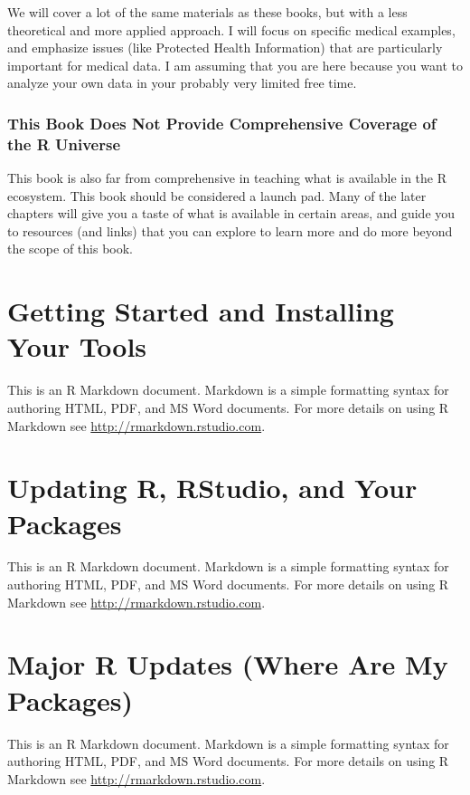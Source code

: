 \documentclass[]{book}
\begin{document}
We will cover a lot of the same materials as these books, but with a less theoretical and more applied approach. I will focus on specific medical examples, and emphasize issues (like Protected Health Information) that are particularly important for medical data. I am assuming that you are here because you want to analyze your own data in your probably very limited free time.

\hypertarget{this-book-does-not-provide-comprehensive-coverage-of-the-r-universe}{%
\subsection{This Book Does Not Provide Comprehensive Coverage of the R Universe}\label{this-book-does-not-provide-comprehensive-coverage-of-the-r-universe}}

This book is also far from comprehensive in teaching what is available in the R ecosystem. This book should be considered a launch pad. Many of the later chapters will give you a taste of what is available in certain areas, and guide you to resources (and links) that you can explore to learn more and do more beyond the scope of this book.

\hypertarget{getting-started-and-installing-your-tools}{%
\chapter{Getting Started and Installing Your Tools}\label{getting-started-and-installing-your-tools}}

This is an R Markdown document. Markdown is a simple formatting syntax for authoring HTML, PDF, and MS Word documents. For more details on using R Markdown see \url{http://rmarkdown.rstudio.com}.

\hypertarget{updating-r-rstudio-and-your-packages}{%
\chapter{Updating R, RStudio, and Your Packages}\label{updating-r-rstudio-and-your-packages}}

This is an R Markdown document. Markdown is a simple formatting syntax for authoring HTML, PDF, and MS Word documents. For more details on using R Markdown see \url{http://rmarkdown.rstudio.com}.

\hypertarget{major-r-updates-where-are-my-packages}{%
\chapter{Major R Updates (Where Are My Packages)}\label{major-r-updates-where-are-my-packages}}

This is an R Markdown document. Markdown is a simple formatting syntax for authoring HTML, PDF, and MS Word documents. For more details on using R Markdown see \url{http://rmarkdown.rstudio.com}.


\end{document}
